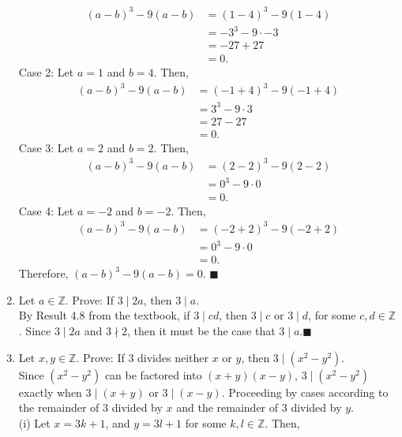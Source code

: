 \documentclass[12pt]{article}
\newcommand{\Z}{\mathbb{Z}}
\begin{document}
\begin{enumerate}
\begin{equation*}
            \begin{split}
                (a-b)^3-9(a-b)&=(1-4)^3-9(1-4)\\
                &=-3^3-9\cdot-3\\
                &=-27+27\\
                &=0.
            \end{split}
        \end{equation*}
        Case 2: Let \(a=1\) and \(b=4\). Then, \begin{equation*}
            \begin{split}
                (a-b)^3-9(a-b)&=(-1+4)^3-9(-1+4)\\
                &=3^3-9\cdot3\\
                &=27-27\\
                &=0.
            \end{split}
        \end{equation*}
        Case 3: Let \(a=2\) and \(b=2\). Then, \begin{equation*}
            \begin{split}
                (a-b)^3-9(a-b)&=(2-2)^3-9(2-2)\\
                &=0^3-9\cdot 0\\
                &=0.
            \end{split}
        \end{equation*}
        Case 4: Let \(a=-2\) and \(b=-2\). Then, \begin{equation*}
            \begin{split}
                (a-b)^3-9(a-b)&=(-2+2)^3-9(-2+2)\\
                &=0^3-9\cdot 0\\
                &=0.
            \end{split}
        \end{equation*}
        Therefore, \((a-b)^3-9(a-b)=0\). \(\blacksquare\)
        \item Let \(a\in\Z\). Prove: If \(3 \mid 2a\), then \(3\mid a\).\\ By Result 4.8 from the textbook, if \(3\mid cd\), then \(3\mid c\) or \(3\mid d\), for some \(c, d\in\Z\). Since \(3\mid 2a\) and \(3\nmid 2\), then it must be the case that \(3\mid a\).\(\blacksquare\)
        \item Let \(x,y\in\Z\). Prove: If 3 divides neither \(x\) or \(y\), then \(3\mid (x^2-y^2)\).\\ Since \((x^2-y^2)\) can be factored into \((x+y)(x-y)\), \(3\mid(x^2-y^2)\) exactly when \(3\mid(x+y)\) or \(3\mid(x-y)\). Proceeding by cases according to the remainder of 3 divided by \(x\) and the remainder of 3 divided by \(y\). \\  (i) Let \(x=3k+1\), and \(y=3l+1\) for some \(k,l\in\Z\). Then,

\end{enumerate}
\end{document}
